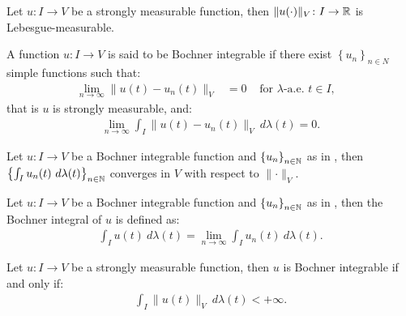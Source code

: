 \begin{lemma}
    Let $u\colon I \rightarrow V$ be a strongly measurable function, then $\lVert u(\cdot) \rVert_V \colon I \rightarrow \mathbb{R}$ is Lebesgue-measurable.
\end{lemma}

\begin{definition} \label{definition:bochner_integrable}
    A function $u\colon I \rightarrow V$ is said to be Bochner integrable if there exist $\left\{ u_n \right\}_{n \in N}$ simple functions such that:
    \begin{align}
        \lim_{n \rightarrow \infty} \lVert u(t) - u_n(t) \rVert_V &= 0 &\text{ for } \lambda \text{-a.e. } t \in I,
&    \end{align}
    that is  $u$ is strongly measurable, and:
    \begin{align}
        \lim_{n \rightarrow \infty} \int_I \lVert u(t) - u_n(t) \rVert_V ~ d \lambda(t) = 0.
    \end{align}
\end{definition}

\begin{lemma}
    Let $u\colon I \rightarrow V$ be a Bochner integrable function and $\left\{ u_n \right\}_{n \in \mathbb{N}}$ as in , then $\left\{ \int_I u_n(t) ~ d \lambda(t) \right\}_{n \in \mathbb{N}}$ converges in $V$ with respect to $\lVert \cdot \rVert_V$.
\end{lemma}

\begin{definition}
    Let $u\colon I \rightarrow V$ be a Bochner integrable function and $\left\{ u_n \right\}_{n \in \mathbb{N}}$ as in , then the Bochner integral of $u$ is defined as:
    \begin{align}
        \int_I u(t) ~ d \lambda(t) = \lim_{n \rightarrow \infty} \int_I u_n(t) ~ d \lambda(t).
    \end{align}
\end{definition}

\begin{theorem}[Bochner]
    Let $u\colon I \rightarrow V$ be a strongly measurable function, then $u$ is Bochner integrable if and only if:
    \begin{align}
        \int_I \lVert u(t) \rVert_V ~ d \lambda(t) < + \infty.
    \end{align}
\end{theorem}

